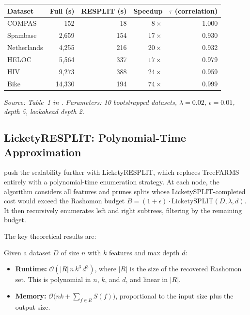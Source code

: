 \begin{center}
\begin{tabular}{lrrrr}
\toprule
Dataset & Full (s) & RESPLIT (s) & Speedup & $\tau$ (correlation) \\
\midrule
COMPAS       & 152    & 18   & $8\times$   & 1.000 \\
Spambase     & 2{,}659 & 154  & $17\times$  & 0.930 \\
Netherlands  & 4{,}255 & 216  & $20\times$  & 0.932 \\
HELOC        & 5{,}564 & 337  & $17\times$  & 0.979 \\
HIV          & 9{,}273 & 388  & $24\times$  & 0.959 \\
Bike         & 14{,}330 & 194 & $74\times$  & 0.999 \\
\bottomrule
\end{tabular}
\end{center}
\emph{Source: Table~1 in \citet{BabbarEtAl2025}.  Parameters:
10 bootstrapped datasets, $\lambda = 0.02$, $\epsilon = 0.01$, depth 5,
lookahead depth 2.}

\subsection{LicketyRESPLIT: Polynomial-Time Approximation}
\label{sec:rashomon:licketyresplit}

\citet{HeileBabbar2025} push the scalability further with LicketyRESPLIT,
which replaces TreeFARMS entirely with a polynomial-time enumeration
strategy.  At each node, the algorithm considers all features and prunes
splits whose LicketySPLIT-completed cost would exceed the Rashomon budget
$B = (1 + \epsilon) \cdot \text{LicketySPLIT}(D, \lambda, d)$.  It then
recursively enumerates left and right subtrees, filtering by the remaining
budget.

The key theoretical results are:

\begin{keyresult}
Given a dataset $D$ of size $n$ with $k$ features and max depth $d$:
\begin{itemize}[leftmargin=1.8em]
  \item \textbf{Runtime:} $\mathcal{O}(|R|\,n\,k^3\,d^3)$, where $|R|$ is
    the size of the recovered Rashomon set.  This is polynomial in $n$, $k$,
    and $d$, and linear in $|R|$.
  \item \textbf{Memory:} $\mathcal{O}\bigl(nk + \sum_{f \in R} S(f)\bigr)$,
    proportional to the input size plus the output size.
\end{itemize}
\end{keyresult}


